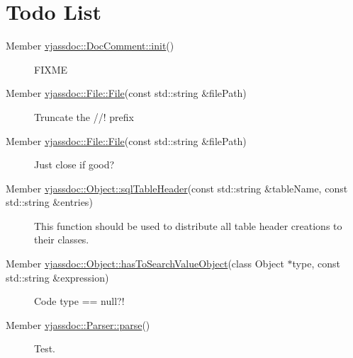 \hypertarget{todo}{}\section{Todo List }\label{todo}
\label{todo__todo000001}
\hypertarget{todo__todo000001}{}
 \begin{description}
\item[Member \hyperlink{classvjassdoc_1_1DocComment_46ada773166611c9be898f74e0eb2315}{vjassdoc::DocComment::init}() ]FIXME \end{description}


\label{todo__todo000002}
\hypertarget{todo__todo000002}{}
 \begin{description}
\item[Member \hyperlink{classvjassdoc_1_1File_d35f0f273a4e7ecc96e4315edb842151}{vjassdoc::File::File}(const std::string \&filePath) ]Truncate the //! prefix \end{description}


\label{todo__todo000002}
\hypertarget{todo__todo000002}{}
 \begin{description}
\item[Member \hyperlink{classvjassdoc_1_1File_d35f0f273a4e7ecc96e4315edb842151}{vjassdoc::File::File}(const std::string \&filePath) ]Just close if good? \end{description}


\label{todo__todo000005}
\hypertarget{todo__todo000005}{}
 \begin{description}
\item[Member \hyperlink{classvjassdoc_1_1Object_b229c2eb3c0c7d1e86d789986bffe3f1}{vjassdoc::Object::sqlTableHeader}(const std::string \&tableName, const std::string \&entries) ]This function should be used to distribute all table header creations to their classes. \end{description}


\label{todo__todo000004}
\hypertarget{todo__todo000004}{}
 \begin{description}
\item[Member \hyperlink{classvjassdoc_1_1Object_e9ed6f9d16334a979405a9f2efab2239}{vjassdoc::Object::hasToSearchValueObject}(class Object $\ast$type, const std::string \&expression) ]Code type == null?! \end{description}


\label{todo__todo000006}
\hypertarget{todo__todo000006}{}
 \begin{description}
\item[Member \hyperlink{classvjassdoc_1_1Parser_25594f25b429a8ff7a4ed426ee0f3184}{vjassdoc::Parser::parse}() ]Test. \end{description}
